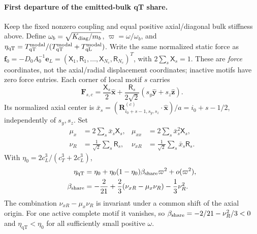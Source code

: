 \documentclass[10pt,aps,onecolumn,notitlepage,nofootinbib]{revtex4-2}
\newcommand{\vR}{\bm R}
\newcommand{\qT}{\mathrm{qT}}
\newcommand{\qL}{\mathrm{qL}}
\begin{document}
\paragraph*{First departure of the emitted-bulk qT share.}
Keep the fixed nonzero coupling and equal positive axial/diagonal bulk
stiffness above. Define $\omega_b=\sqrt{K_{\rm diag}/m_b}$,
$\varpi=\omega/\omega_b$, and
$\eta_{\qT}=T_{\qT}^{\rm modal}/(T_{\qT}^{\rm modal}+T_{\qL}^{\rm modal})$.
Write the same normalized static force as
$\bm f_0=-D_0A_0^{-1}\bm e_L
=(\mathsf X_1,\mathsf R_1,\ldots,\mathsf X_{N_c},\mathsf R_{N_c})^T$,
with $2\sum_s\mathsf X_s=1$. These are \emph{force} coordinates, not
the axial/radial displacement coordinates; inactive motifs have zero
force entries. Each corner of local motif $s$
carries
\[
 \bm F_{s,c}=\frac{\mathsf X_s}{2}\hat{\bm x}+
 \frac{\mathsf R_s}{2\sqrt2}(s_y\hat{\bm y}+s_z\hat{\bm z}).
\]
Its normalized axial center is
$\bar x_s=(\vR_{i_0+s-1,s_y,s_z}^{(c)}\cdot\hat{\bm x})/a
=i_0+s-1/2$, independently of $s_y,s_z$. Set
\[
 \begin{aligned}
 \mu_x&=2\sum_s\bar x_s\mathsf X_s,
 &\mu_{xx}&=2\sum_s\bar x_s^2\mathsf X_s,\\
 \nu_R&=\frac1{\sqrt2}\sum_s\mathsf R_s,
 &\nu_{xR}&=\frac1{\sqrt2}\sum_s\bar x_s\mathsf R_s.
 \end{aligned}
\]
With $\eta_0=2c_L^3/(c_T^3+2c_L^3)$,
\[
 \begin{aligned}
 \eta_{\qT}
 &=\eta_0+\eta_0(1-\eta_0)\beta_{\rm share}\varpi^2+o(\varpi^2),\\
 \beta_{\rm share}
 &=-\frac2{21}+\frac23(\nu_{xR}-\mu_x\nu_R)-\frac13\nu_R^2.
 \end{aligned}
\]
The combination $\nu_{xR}-\mu_x\nu_R$ is invariant under a common
shift of the axial origin. For one active complete motif it vanishes,
so $\beta_{\rm share}=-2/21-\nu_R^2/3<0$ and
$\eta_{\qT}<\eta_0$ for all sufficiently small positive $\omega$.
\end{document}
